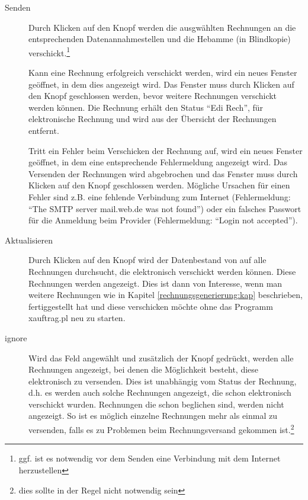\begin{description}
\item[Senden]
Durch Klicken auf den Knopf  werden die ausgwählten Rechnungen
an die entsprechenden Datenannahmestellen und die Hebamme (in Blindkopie)
verschickt.\footnote{ggf. 
ist es notwendig vor dem Senden eine Verbindung mit dem Internet herzustellen} 

Kann eine Rechnung erfolgreich verschickt werden, wird ein neues Fenster
geöffnet, in dem dies angezeigt wird. Das Fenster muss durch Klicken
auf den Knopf  geschlossen werden, bevor weitere Rechnungen
verschickt werden können. Die Rechnung erhält den Status 
``Edi Rech'', für elektronische Rechnung und wird aus der Übersicht der
Rechnungen entfernt.

Tritt ein Fehler beim Verschicken der Rechnung auf, wird ein neues Fenster
geöffnet, in dem eine entsprechende Fehlermeldung angezeigt wird. Das
Versenden der Rechnungen wird abgebrochen und das Fenster muss
durch Klicken auf den Knopf  geschlossen werden. 
Mögliche Ursachen für einen
Fehler sind z.B. eine fehlende Verbindung zum Internet (Fehlermeldung:
``The SMTP server mail.web.de was not found'') oder ein falsches
Passwort für die Anmeldung beim Provider (Fehlermeldung: ``Login not
accepted'').

\item[Aktualisieren]
Durch Klicken auf den Knopf  wird der Datenbestand
von \tinyHeb\/ auf alle Rechnungen durchsucht, die elektronisch verschickt
werden können. Diese Rechnungen werden angezeigt. Dies ist dann von
Interesse, wenn man weitere Rechnungen wie in Kapitel 
\vref{rechnungsgenerierung:kap} beschrieben, fertiggestellt hat 
und diese verschicken
möchte ohne das Programm xauftrag.pl neu zu starten.

\item[ignore]
Wird das Feld  angewählt und zusätzlich der Knopf
 gedrückt, werden alle Rechnungen angezeigt,
bei denen die Möglichkeit besteht, diese elektronisch zu versenden.
Dies ist unabhängig vom Status der Rechnung, d.h. es werden auch solche
Rechnungen angezeigt, die schon elektronisch verschickt wurden.
Rechnungen die schon beglichen sind, werden nicht angezeigt.
So ist es möglich einzelne Rechnungen mehr als einmal zu versenden,
falls es zu Problemen beim Rechnungsversand gekommen 
ist.\footnote{dies sollte in der Regel nicht notwendig sein}


\end{description}
